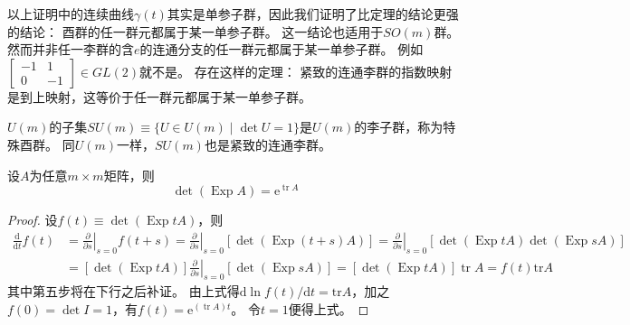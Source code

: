 \begin{note}
    以上证明中的连续曲线$\gamma(t)$其实是单参子群，因此我们证明了比定理的结论更强的结论：
    酉群的任一群元都属于某一单参子群。
    这一结论也适用于$SO(m)$群。
    然而并非任一李群的含$e$的连通分支的任一群元都属于某一单参子群。
    例如$\begin{bmatrix}
        -1 & 1 \\
        0 & -1
    \end{bmatrix} \in GL(2)$就不是。
    存在这样的定理：
    紧致的连通李群的指数映射是到上映射，这等价于任一群元都属于某一单参子群。
\end{note}

$U(m)$的子集$SU(m) \equiv \{U \in U(m) \mid \det U = 1\}$是$U(m)$的李子群，称为特殊酉群。
同$U(m)$一样，$SU(m)$也是紧致的连通李群。

\begin{theorem}
    设$A$为任意$m \times m$矩阵，则
    $$\det(\operatorname{Exp}A) = \mathrm{e}^{\operatorname{tr}A}$$
\end{theorem}

\begin{proof}
    设$f(t) \equiv \det(\operatorname{Exp}tA)$，则
    \[\begin{split}
        \frac{\mathrm{d}}{\mathrm{d}t}f(t) & = \left.\frac{\partial}{\partial s}\right|_{s = 0}f(t + s) = \left.\frac{\partial}{\partial s}\right|_{s = 0}[\det(\operatorname{Exp}(t + s)A)] = \left.\frac{\partial}{\partial s}\right|_{s = 0}[\det(\operatorname{Exp}tA)\det(\operatorname{Exp}sA)] \\
        & = [\det(\operatorname{Exp}tA)]\left.\frac{\partial}{\partial s}\right|_{s = 0}[\det(\operatorname{Exp}sA)] = [\det(\operatorname{Exp}tA)]\operatorname{tr}A = f(t)\mathrm{tr}A
    \end{split}\]
    其中第五步将在下行之后补证。
    由上式得$\mathrm{d}\ln f(t) / \mathrm{d}t = \mathrm{tr}A$，加之$f(0) = \det I = 1$，有$f(t) = \mathrm{e}^{(\operatorname{tr}A)t}$。
    令$t = 1$便得上式。
\end{proof}


